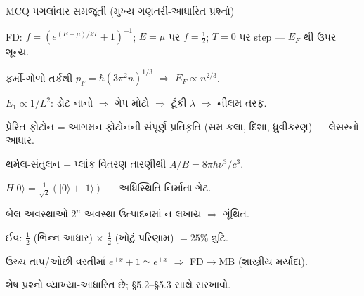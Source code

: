 \begin{javabchavi}{MCQ પગલાંવાર સમજૂતી (મુખ્ય ગણતરી-આધારિત પ્રશ્નો)}
\begin{description}[style=nextline,itemsep=0pt]
  \item[6./7.] FD: $f=(e^{(E-\mu)/kT}+1)^{-1}$; $E=\mu$ પર $f=\tfrac12$; $T=0$ પર step — $E_F$ થી ઉપર શૂન્ય.
  \item[8.] ફર્મી-ગોળો તર્કથી $p_F=\hbar(3\pi^{2}n)^{1/3}$ $\Rightarrow$ $E_F\propto n^{2/3}$.
  \item[15.] $E_1\propto1/L^{2}$: ડોટ નાનો $\Rightarrow$ ગેપ મોટો $\Rightarrow$ ટૂંકી $\lambda$ $\Rightarrow$ નીલમ તરફ.
  \item[17.] પ્રેરિત ફોટોન = આગમન ફોટોનની સંપૂર્ણ પ્રતિકૃતિ (સમ-કલા, દિશા, ધ્રુવીકરણ) — લેસરનો આધાર.
  \item[19.] થર્મલ-સંતુલન + પ્લાંક વિતરણ તારણીથી $A/B=8\pi h\nu^{3}/c^{3}$.
  \item[31.] $H|0\rangle=\tfrac{1}{\sqrt2}(|0\rangle+|1\rangle)$ — અધિસ્થિતિ-નિર્માતા ગેટ.
  \item[34.] બેલ અવસ્થાઓ $2^{n}$-અવસ્થા ઉત્પાદનમાં ન લખાય $\Rightarrow$ ગૂંથિત.
  \item[39.] ઈવ: $\tfrac12$ (ભિન્ન આધાર) × $\tfrac12$ (ખોટું પરિણામ) $=25\%$ ત્રુટિ.
  \item[42.] ઉચ્ચ તાપ/ઓછી વસ્તીમાં $e^{\pm x}+1\simeq e^{\pm x}$ $\Rightarrow$ FD$\to$MB (શાસ્ત્રીય મર્યાદા).
\end{description}
શેષ પ્રશ્નો વ્યાખ્યા-આધારિત છે; \S5.2--\S5.3 સાથે સરખાવો.
\end{javabchavi}
